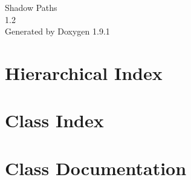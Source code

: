 \let\mypdfximage\pdfximage\def\pdfximage{\immediate\mypdfximage}\documentclass[twoside]{book}
\newcommand{\+}{\discretionary{\mbox{\scriptsize$\hookleftarrow$}}{}{}}
\newcommand{\clearemptydoublepage}{%
  \newpage{\pagestyle{empty}\cleardoublepage}%
}
\begin{document}
\raggedbottom

\begin{titlepage}
\vspace*{7cm}
\begin{center}%
{\Large Shadow Paths \\[1ex]\large 1.\+2 }\\
\vspace*{1cm}
{\large Generated by Doxygen 1.9.1}\\
\end{center}
\end{titlepage}
\clearemptydoublepage
{}
\tableofcontents
\clearemptydoublepage
{}

\chapter{Hierarchical Index}

\chapter{Class Index}

\chapter{Class Documentation}













\backmatter
\newpage
{}
\clearemptydoublepage
{}
\printindex
\end{document}
